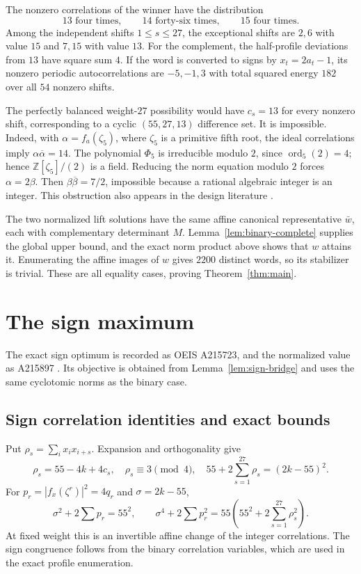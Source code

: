 \documentclass[11pt,a4paper]{article}
\theoremstyle{remark}
\begin{document}
The nonzero correlations of the winner have the distribution
\[
  13\text{ four times},\qquad
  14\text{ forty-six times},\qquad
  15\text{ four times}.
\]
Among the independent shifts $1\leq s\leq27$, the exceptional shifts are
$2,6$ with value $15$ and $7,15$ with value $13$.  For the complement, the
half-profile deviations from $13$ have square sum $4$.  If the word is
converted to signs by $x_t=2a_t-1$, its nonzero periodic autocorrelations
are $-5,-1,3$ with total squared energy $182$ over all $54$ nonzero shifts.

The perfectly balanced weight-$27$ possibility would have
$c_s=13$ for every nonzero shift, corresponding to a cyclic
$(55,27,13)$ difference set.  It is impossible.  Indeed, with
$\alpha=f_a(\zeta_5)$, where $\zeta_5$ is a primitive fifth root, the ideal
correlations imply $\alpha\overline\alpha=14$.  The polynomial
$\Phi_5$ is irreducible modulo $2$, since $\operatorname{ord}_5(2)=4$;
hence $\mathbb Z[\zeta_5]/(2)$ is a field.  Reducing the norm equation
modulo $2$ forces $\alpha=2\beta$.  Then
$\beta\overline\beta=7/2$, impossible because a rational algebraic integer
is an integer.  This obstruction also appears in the design literature
\cite{braic}.

The two normalized lift solutions have the same affine canonical
representative $\bar w$, each with complementary determinant $M$.
Lemma~\ref{lem:binary-complete} supplies the global upper bound,
and the exact norm product above shows that $w$ attains it.
Enumerating the affine images of $w$ gives $2200$ distinct words,
so its stabilizer is trivial.  These are all equality cases,
proving Theorem~\ref{thm:main}.


\section{The sign maximum}\label{sec:sign}

The exact sign optimum is recorded as OEIS A215723, and the
normalized value as A215897 \cite{oeis-sign,oeis-sign-scaled}.
Its objective is obtained from Lemma~\ref{lem:sign-bridge}
and uses the same cyclotomic norms as the binary case.

\subsection{Sign correlation identities and exact bounds}

Put $\rho_s=\sum_i x_ix_{i+s}$. Expansion and orthogonality give
\[
 \rho_s=55-4k+4c_s,\quad \rho_s\equiv3\pmod4,\quad
 55+2\sum_{s=1}^{27}\rho_s=(2k-55)^2.
\]
For $p_r=|f_x(\zeta^r)|^2=4q_r$ and $\sigma=2k-55$,
\[
 \sigma^2+2\sum p_r=55^2,\qquad
 \sigma^4+2\sum p_r^2=55\left(55^2+2\sum_{s=1}^{27}\rho_s^2\right).
\]
At fixed weight this is an invertible affine change of the integer
correlations. The sign congruence follows from the binary
correlation variables, which are used in the exact profile enumeration.
\end{document}
